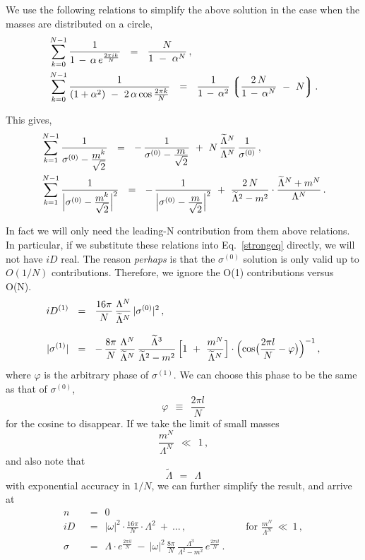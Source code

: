 \documentclass[epsfig,12pt]{article}
\newcommand{\wt}{\widetilde}
\newcommand{\lgr}{\left\lgroup}
\newcommand{\rgr}{\right\rgroup}
\newcommand{\Do}{{D^{(1)}}}
\newcommand{\sigz}{{\sigma^{(0)}}}
\newcommand{\sigo}{{\sigma^{(1)}}}
\begin{document}
	We use the following relations to simplify the above solution in the case when the masses 
	are distributed on a circle,
\begin{align*}
%
	&
	\sum_{k=0}^{N-1} \frac{1} { 1 \,-\, \alpha\,e^{\frac{2\pi i k}{N}} } ~~=~~
		\frac{N}{1 ~-~ \alpha^N}\,,
	\\
%
	&
	\sum_{k=0}^{N-1} \frac{1} { (1 + \alpha^2) ~-~ 2\,\alpha \cos \frac{2 \pi k}{N} }
		~~=~~
	\frac{1} {1 \,-\, \alpha^2} 
	\lgr \frac{2\,N}{ 1 \,-\, \alpha^N } ~-~ N \rgr .
\end{align*}

	This gives,
\begin{align*}
%
	& 
	\sum_{k=1}^{N-1} \frac{ 1 }
		{ \sigz - \frac{\displaystyle m^k}{\displaystyle \sqrt{2}} } ~~=~~ 
		 - \, \frac{ 1 }
		{ \sigz - \frac{\displaystyle m}{\displaystyle \sqrt{2}} } ~+~
		N\, \frac{\wt{\Lambda}{}^N}{\Lambda^N}\, \frac{1}{\sigz} \,,
	\\
%
	&
	\sum_{k=1}^{N-1} \frac{ 1 }
                { \Bigl| \sigz - \frac{\displaystyle m^k}{\displaystyle \sqrt{2}} \Bigr|^2 } ~~=~~
	-\, \frac{1}
	{ \Bigl| \sigz - \frac{\displaystyle m}{\displaystyle \sqrt{2}} \Bigr|^2 } 
	~+~
	\frac{2\,N}{ \wt{\Lambda}{}^2 - m^2 } \cdot
	\frac{ \wt{\Lambda}{}^N + m^N } { \Lambda^N }\,.
\end{align*}

	In fact we will only need the leading-N contribution from them above relations.
	In particular, if we substitute these relations into Eq.~\eqref{strongeq} directly,
	we will not have $ iD $ real.
	The reason {\it perhaps} is that the $ \sigz $ solution is only valid up to $ O(1/N) $
	contributions.
	Therefore, we ignore the O(1) contributions versus O(N).
\begin{align*}
%
	i \Do & ~~=~~ \frac{16\pi}{N}\, \frac{\Lambda^N}{\wt{\Lambda}{}^N}\, |\sigz|^2\,,
	\\[3mm]
%
	| \sigo | & ~~=~~
	-\, \frac{8\pi}{N}\, \frac{\Lambda^N}{\wt{\Lambda}{}^N}\,
		\frac{ \wt{\Lambda}{}^3 } {\wt{\Lambda}{}^2 - m^2 }\,
		\Bigl[ 1 ~+~ \frac{m^N}{\wt{\Lambda}{}^N} \Bigr] \cdot
		\Bigl( \cos \bigl( \frac{2\pi l }{N} - \varphi \bigr) \Bigr)^{-1}\,,
\end{align*}
	where $ \varphi $ is the arbitrary phase of $ \sigo $.
	We can choose this phase to be the same as that of $ \sigz $, 
\[
	\varphi ~~\equiv~~ \frac{2\pi l}{N}
\]
	for the cosine to disappear.
	If we take the limit of small masses
\[
	\frac{m^N}{\Lambda^N} ~~\ll~~ 1\,,
\]
	and also note that
\[
	\wt{\Lambda} ~~=~~ \Lambda 
\]
	with exponential accuracy in $ 1/N $,
	we can further simplify the result, and arrive at
\begin{align*}
%
	n & ~~=~~ 0 
	\\[3mm]
%
	i D &  ~~=~~ |\omega|^2 \cdot \frac{16\pi}{N}\cdot \Lambda^2 ~+~ \ldots \,, 
	\qquad\qquad\qquad \text{for }\frac{m^N}{\Lambda^N} ~\ll~ 1\,,
	\\[3mm]
%
	\sigma & ~~=~~ \Lambda \cdot e^{\frac{2\pi i l}{N}} 
			~-~ |\omega|^2\, \frac{8\pi}{N}\, 
				\frac{\Lambda^3}{\Lambda^2 - m^2}\, e^{\frac{2\pi i l}{N}}
	\,.
\end{align*}
\end{document}

